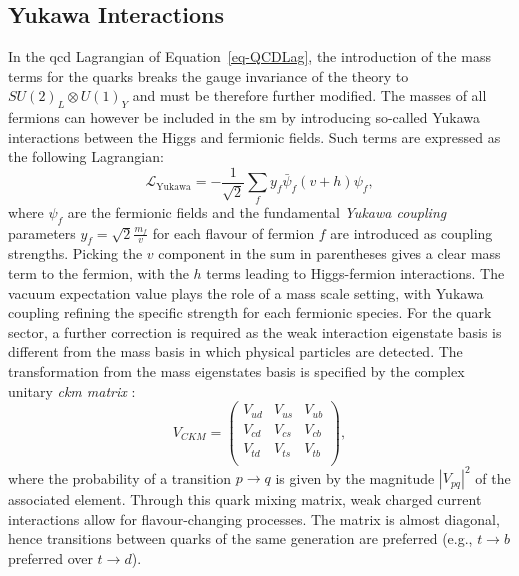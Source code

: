 \subsection{Yukawa Interactions}\label{subset-yukint}
In the \gls{qcd} Lagrangian of Equation~\ref{eq-QCDLag}, the introduction of the mass terms for the quarks breaks the gauge invariance of the theory to $SU(2)_L \otimes U(1)_Y$ and must be therefore further modified. The masses of all fermions can however be included in the \gls{sm} by introducing so-called Yukawa interactions between the Higgs and fermionic fields. Such terms are expressed as the following Lagrangian:
\begin{equation}\label{eq-YukLag}
    \mathcal{L}_{\text{Yukawa}} = - \frac{1}{\sqrt{2}} \sum_{f} 
    y_f \bar{\psi}_f (v + h) \psi_f,
\end{equation}
where $\psi_f$ are the fermionic fields and the fundamental \textit{Yukawa coupling} parameters $y_f = \sqrt{2} \frac{m_f}{v}$ for each flavour of fermion $f$ are introduced as coupling strengths. Picking the $v$ component in the sum in parentheses gives a clear mass term to the fermion, with the $h$ terms leading to Higgs-fermion interactions. The vacuum expectation value plays the role of a mass scale setting, with Yukawa coupling refining the specific strength for each fermionic species. For the quark sector, a further correction is required as the weak interaction eigenstate basis is different from the mass basis in which physical particles are detected. The transformation from the mass eigenstates basis is specified by the complex unitary \textit{\gls{ckm} matrix} \cite{Tanabashi:2018oca}:
\begin{equation}
    V_{CKM} = \begin{pmatrix}
            V_{ud} & V_{us} & V_{ub}\\ 
            V_{cd} & V_{cs} & V_{cb}\\ 
            V_{td} & V_{ts} & V_{tb}\\ 
        \end{pmatrix},
\end{equation}
where the probability of a transition $p \rightarrow q$ is given by the magnitude $|V_{pq}|^2$ of the associated element. Through this quark mixing matrix, weak charged current interactions allow for flavour-changing processes. The matrix is almost diagonal, hence transitions between quarks of the same generation are preferred (e.g., $t \rightarrow b$ preferred over $t \rightarrow d$).

